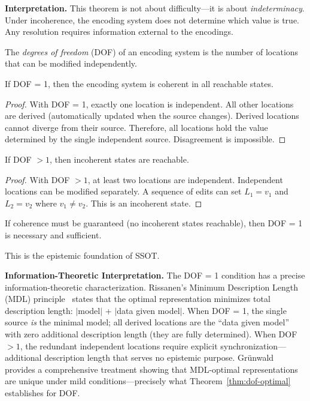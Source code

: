 \textbf{Interpretation.} This theorem is not about difficulty---it is about \emph{indeterminacy}. Under incoherence, the encoding system does not determine which value is true. Any resolution requires information external to the encodings.

\begin{definition}\label{def:dof-epistemic}
The \emph{degrees of freedom} (DOF) of an encoding system is the number of locations that can be modified independently.
\end{definition}

\begin{theorem}[DOF = 1 Guarantees Coherence]\label{thm:dof-one-coherence}
If DOF = 1, then the encoding system is coherent in all reachable states.
\end{theorem}

\begin{proof}
With DOF = 1, exactly one location is independent. All other locations are derived (automatically updated when the source changes). Derived locations cannot diverge from their source. Therefore, all locations hold the value determined by the single independent source. Disagreement is impossible.
\end{proof}

\begin{theorem}\label{thm:dof-gt-one-incoherence}
If DOF $> 1$, then incoherent states are reachable.
\end{theorem}

\begin{proof}
With DOF $> 1$, at least two locations are independent. Independent locations can be modified separately. A sequence of edits can set $L_1 = v_1$ and $L_2 = v_2$ where $v_1 \neq v_2$. This is an incoherent state.
\end{proof}

\begin{corollary}[Coherence Forces DOF = 1]\label{cor:coherence-forces-ssot}
If coherence must be guaranteed (no incoherent states reachable), then DOF = 1 is necessary and sufficient.
\end{corollary}

This is the epistemic foundation of SSOT.

\textbf{Information-Theoretic Interpretation.} The DOF = 1 condition has a precise information-theoretic characterization. Rissanen's Minimum Description Length (MDL) principle~\cite{rissanen1978mdl} states that the optimal representation minimizes total description length: $|$model$|$ + $|$data given model$|$. When DOF = 1, the single source \emph{is} the minimal model; all derived locations are the ``data given model'' with zero additional description length (they are fully determined). When DOF $> 1$, the redundant independent locations require explicit synchronization---additional description length that serves no epistemic purpose. Grünwald~\cite{gruenwald2007mdl} provides a comprehensive treatment showing that MDL-optimal representations are unique under mild conditions---precisely what Theorem~\ref{thm:dof-optimal} establishes for DOF.


